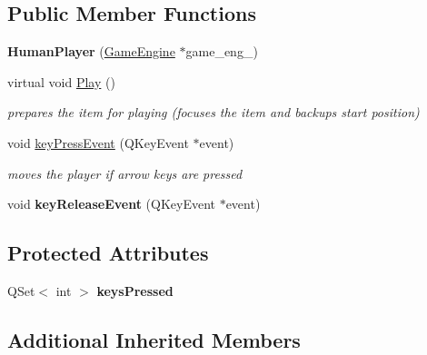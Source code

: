 \subsection*{Public Member Functions}
\begin{DoxyCompactItemize}
\item 
{\bfseries Human\+Player} (\hyperlink{class_game_engine}{Game\+Engine} $\ast$game\+\_\+eng\+\_\+)\hypertarget{class_human_player_a8c9446abf36e24e405d580928151bc50}{}\label{class_human_player_a8c9446abf36e24e405d580928151bc50}

\item 
virtual void \hyperlink{class_human_player_aefcbcec78412bcc9d46a39324f9f2263}{Play} ()\hypertarget{class_human_player_aefcbcec78412bcc9d46a39324f9f2263}{}\label{class_human_player_aefcbcec78412bcc9d46a39324f9f2263}

\begin{DoxyCompactList}\small\item\em prepares the item for playing (focuses the item and backups start position) \end{DoxyCompactList}\item 
void \hyperlink{class_human_player_aef6252dc1b716e9bf5e4da125f811b98}{key\+Press\+Event} (Q\+Key\+Event $\ast$event)
\begin{DoxyCompactList}\small\item\em moves the player if arrow keys are pressed \end{DoxyCompactList}\item 
void {\bfseries key\+Release\+Event} (Q\+Key\+Event $\ast$event)\hypertarget{class_human_player_a58a146dcbb5345557d5224fdabd336dc}{}\label{class_human_player_a58a146dcbb5345557d5224fdabd336dc}

\end{DoxyCompactItemize}
\subsection*{Protected Attributes}
\begin{DoxyCompactItemize}
\item 
Q\+Set$<$ int $>$ {\bfseries keys\+Pressed}\hypertarget{class_human_player_a15509afba818f1d43397ee1223362e3a}{}\label{class_human_player_a15509afba818f1d43397ee1223362e3a}

\end{DoxyCompactItemize}
\subsection*{Additional Inherited Members}


